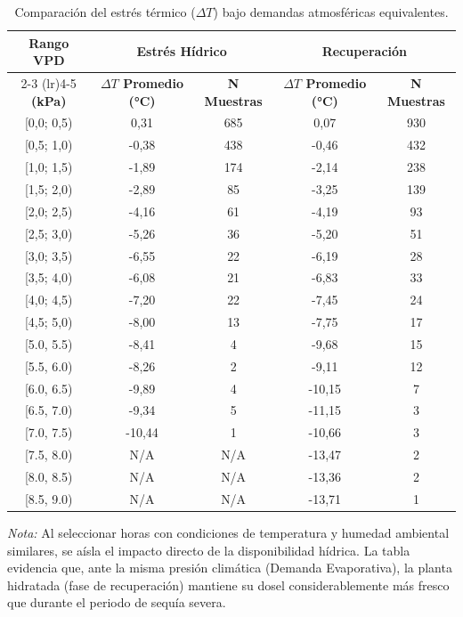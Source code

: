 \FloatBarrier
\begin{table}[h!]
    \centering
    \caption{Comparación del estrés térmico ($\Delta T$) bajo demandas atmosféricas equivalentes.}
    \label{tab:deltaT_vs_VPD}
    \small %
    \begin{tabular}{c c c c c}
        \toprule
        \textbf{Rango VPD} & \multicolumn{2}{c}{\textbf{Estrés Hídrico}} & \multicolumn{2}{c}{\textbf{Recuperación}} \\
        \cmidrule(lr){2-3} \cmidrule(lr){4-5}
        \textbf{(kPa)} & \textbf{$\Delta T$ Promedio (°C)} & \textbf{N Muestras} & \textbf{$\Delta T$ Promedio (°C)} & \textbf{N Muestras} \\
        \midrule
        {[}0,0; 0,5) & 0,31 & 685 & 0,07 & 930 \\
        {[}0,5; 1,0) & -0,38 & 438 & -0,46 & 432 \\
        {[}1,0; 1,5) & -1,89 & 174 & -2,14 & 238 \\
        {[}1,5; 2,0) & -2,89 & 85 & -3,25 & 139 \\
        {[}2,0; 2,5) & -4,16 & 61 & -4,19 & 93 \\
        {[}2,5; 3,0) & -5,26 & 36 & -5,20 & 51 \\
        {[}3,0; 3,5) & -6,55 & 22 & -6,19 & 28 \\
        {[}3,5; 4,0) & -6,08 & 21 & -6,83 & 33 \\
        {[}4,0; 4,5) & -7,20 & 22 & -7,45 & 24 \\
        {[}4,5; 5,0) & -8,00 & 13 & -7,75 & 17 \\
        {[}5.0, 5.5) & -8,41 & 4 & -9,68 & 15 \\
        {[}5.5, 6.0) & -8,26 & 2 & -9,11 & 12 \\
        {[}6.0, 6.5) & -9,89 & 4 & -10,15 & 7 \\
        {[}6.5, 7.0) & -9,34 & 5 & -11,15 & 3 \\
        {[}7.0, 7.5) & -10,44 & 1 & -10,66 & 3 \\
        {[}7.5, 8.0) & N/A & N/A & -13,47 & 2 \\
        {[}8.0, 8.5) & N/A & N/A & -13,36 & 2 \\
        {[}8.5, 9.0) & N/A & N/A & -13,71 & 1 \\
        \bottomrule
    \end{tabular}
    \vspace{0.5em}
    \begin{minipage}{0.9\textwidth}
    \small{\textit{Nota:} Al seleccionar horas con condiciones de temperatura y humedad ambiental similares, se aísla el impacto directo de la disponibilidad hídrica. La tabla evidencia que, ante la misma presión climática (Demanda Evaporativa), la planta hidratada (fase de recuperación) mantiene su dosel considerablemente más fresco que durante el periodo de sequía severa.}
    \end{minipage}
\end{table}
\FloatBarrier

